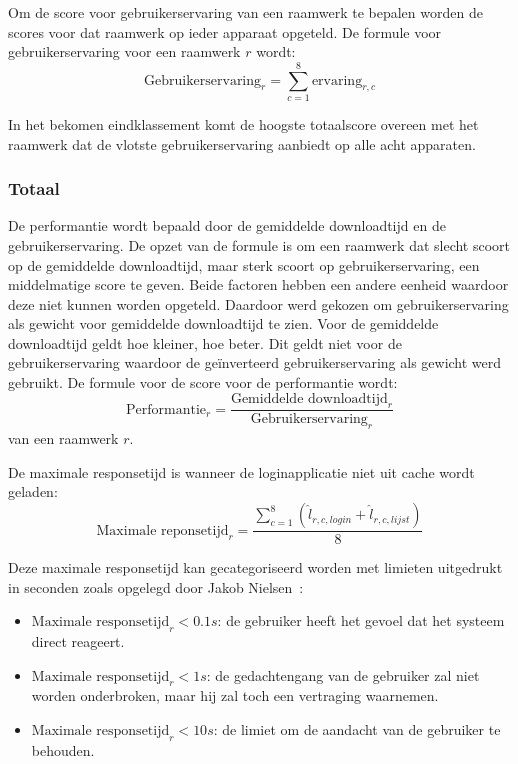 Om de score voor gebruikerservaring van een raamwerk te bepalen worden de scores voor dat raamwerk op ieder apparaat opgeteld. De formule voor gebruikerservaring voor een raamwerk $r$ wordt:
\begin{equation}
  \text{Gebruikerservaring}_r = \sum_{c=1}^{8}{\text{ervaring}_{r,c}}
  \label{eq:performantie-gebruikservaring}
\end{equation}

In het bekomen eindklassement komt de hoogste totaalscore overeen met het raamwerk dat de vlotste gebruikerservaring aanbiedt op alle acht apparaten. 

\subsubsection{Totaal}
De performantie wordt bepaald door de gemiddelde downloadtijd en de gebruikerservaring.
De opzet van de formule is om een raamwerk dat slecht scoort op de gemiddelde downloadtijd, maar sterk scoort op gebruikerservaring, een middelmatige score te geven.
Beide factoren hebben een andere eenheid waardoor deze niet kunnen worden opgeteld.
Daardoor werd gekozen om gebruikerservaring als gewicht voor gemiddelde downloadtijd te zien.
Voor de gemiddelde downloadtijd geldt hoe kleiner, hoe beter.
Dit geldt niet voor de gebruikerservaring waardoor de geïnverteerd gebruikerservaring als gewicht werd gebruikt.
De formule voor de score voor de performantie wordt:
\begin{equation}
  \text{Performantie}_r = \frac{\text{Gemiddelde downloadtijd}_r}{\text{Gebruikerservaring}_r}
  \label{eq:performantie-enhanced}
\end{equation}
van een raamwerk $r$. 


De maximale responsetijd is wanneer de loginapplicatie niet uit cache wordt geladen:
\begin{equation}
  \text{Maximale reponsetijd}_r= \frac{\sum\limits_{c=1}^{8}\left(\widehat{l}_{r,c,login} + \widehat{l}_{r,c,lijst}\right)}{8}
  \label{eq:performantie-max}
\end{equation}

Deze maximale responsetijd kan gecategoriseerd worden met limieten uitgedrukt in seconden zoals opgelegd door Jakob Nielsen~\cite{Nielsen1993}:  
\begin{itemize}
\item $\text{Maximale responsetijd}_r < 0.1\unit{s}$: de gebruiker heeft het gevoel dat het systeem direct reageert.
\item $\text{Maximale responsetijd}_r < 1\unit{s}$: de gedachtengang van de gebruiker zal niet worden onderbroken, maar hij zal toch een vertraging waarnemen.
\item $\text{Maximale responsetijd}_r < 10\unit{s}$: de limiet om de aandacht van de gebruiker te behouden.
\end{itemize}

